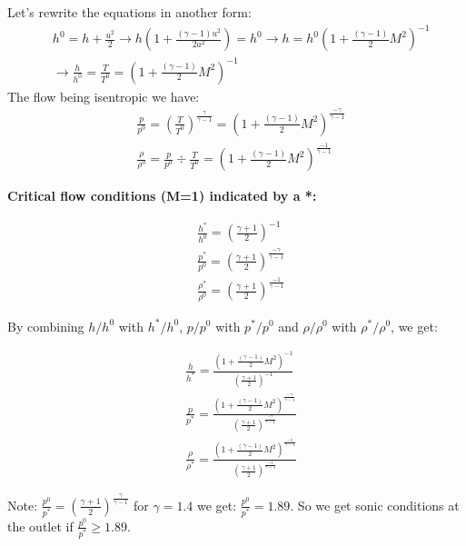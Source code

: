 Let's rewrite the equations in another form:
 \begin{equation}
\begin{aligned}
&h^0=h+\frac{u^2}{2}  \rightarrow h(1+\frac{(\gamma-1) u^2}{2a^2})=h^0  \rightarrow h=h^0(1+\frac{(\gamma-1) }{2}M^2)^{-1} \\
& \rightarrow\frac{h}{h^0}=\frac{T}{T^0}=(1+\frac{(\gamma-1) }{2}M^2)^{-1}
\end{aligned} 
\end{equation}
The flow being isentropic we have:
 \begin{equation}
\begin{aligned}
&\frac{p}{p^0}=(\frac{T}{T^0})^{\frac{\gamma}{\gamma-1}}=(1+\frac{(\gamma-1) }{2}M^2)^{\frac{-\gamma}{\gamma-1}} \\
&\frac{\rho}{\rho^0}=\frac{p}{p^0} \div \frac{T}{T^0}=(1+\frac{(\gamma-1) }{2}M^2)^{\frac{-1}{\gamma-1}} 
\end{aligned} 
\end{equation}

\textbf{Critical flow conditions (M=1) indicated by a *:}

 \begin{equation}
\begin{aligned}
&\frac{h^*}{h^0}=(\frac{\gamma+1 }{2})^{-1} \\
&\frac{p^*}{p^0}=(\frac{\gamma+1}{2})^{\frac{-\gamma}{\gamma-1}} \\
&\frac{\rho^*}{\rho^0}=(\frac{\gamma+1}{2})^{\frac{-1}{\gamma-1}} 
\end{aligned} 
\end{equation}

By combining $h/h^0$ with $h^*/h^0$, $p/p^0$ with $p^*/p^0$ and $\rho/\rho^0$ with $\rho^*/\rho^0$, we get: 

 \begin{equation}
\begin{aligned}
&\frac{h}{h^*}=\frac{(1+\frac{(\gamma-1) }{2}M^2)^{-1}}{(\frac{\gamma+1 }{2})^{-1}}\\
&\frac{p}{p^*}= \frac{(1+\frac{(\gamma-1) }{2}M^2)^{\frac{-\gamma}{\gamma-1}}}{(\frac{\gamma+1}{2})^{\frac{-\gamma}{\gamma-1}}}\\
&\frac{\rho}{\rho^*}=\frac{(1+\frac{(\gamma-1) }{2}M^2)^{\frac{-1}{\gamma-1}} }{(\frac{\gamma+1}{2})^{\frac{-1}{\gamma-1}} }
\end{aligned} 
\end{equation}

Note:  $\frac{p^0}{p^*}=(\frac{\gamma+1}{2})^{\frac{\gamma}{\gamma-1}}$ for $\gamma=1.4$ we get: $\frac{p^0}{p^*}=1.89$. So we get sonic conditions at the outlet if $\frac{p^0}{p^*} \geq 1.89$.

